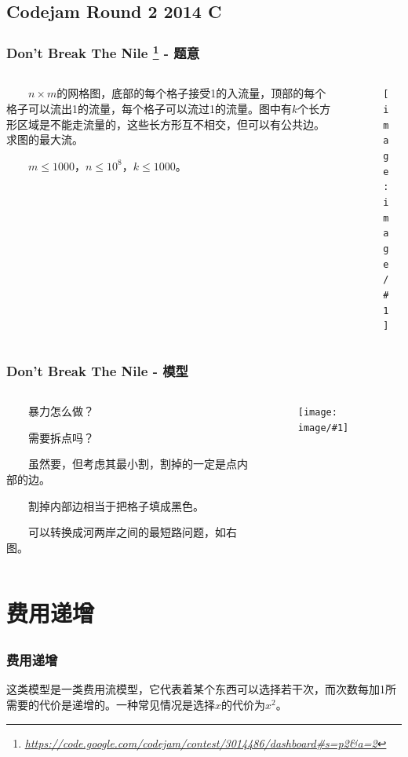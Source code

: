 \documentclass[9pt,dvipsnames,table]{beamer}
\newcommand{\hlink}[1]{
	\footnote{\fontsize{6pt}{\baselineskip}\href{#1}{\textsl{\underline{#1}}}}
}
\newcommand{\graph}[2]
{\begin{figure}[h]
	\centering
	\texttt{[image: image/\#1]}
\end{figure}}
\begin{document}
\subsection{Codejam Round 2 2014 C}
\begin{frame}
	\frametitle{Don't Break The Nile\hlink{https://code.google.com/codejam/contest/3014486/dashboard\#s=p2\&a=2} - 题意}
	\begin{columns}
		\begin{column}{0.475\textwidth}
			　　$n\times m$的网格图，底部的每个格子接受1的入流量，顶部的每个格子可以流出1的流量，每个格子可以流过1的流量。图中有$k$个长方形区域是不能走流量的，这些长方形互不相交，但可以有公共边。求图的最大流。
			
			　　$m\leq 1000$，$n\leq 10^8$，$k\leq 1000$。
		\end{column}
		\begin{column}{0.45\textwidth}
			\graph{codejam_1.png}{0.75}
		\end{column}
	\end{columns}
\end{frame}
\begin{frame}
	\frametitle{Don't Break The Nile - 模型}
	\begin{columns}
		\begin{column}{0.45\textwidth}
			　　暴力怎么做？\pause 
			
			　　需要拆点吗？\pause
			
			　　虽然要，但考虑其最小割，割掉的一定是点内部的边。\pause
			
			　　割掉内部边相当于把格子填成黑色。\pause
			
			　　可以转换成河两岸之间的最短路问题，如右图。
		\end{column}
		\begin{column}{0.45\textwidth}
			\graph{codejam_2.png}{0.8}
		\end{column}
	\end{columns}
\end{frame}

\section[Model V]{费用递增}
\subsection{}
\begin{frame}
	\frametitle{费用递增}
	这类模型是一类费用流模型，它代表着某个东西可以选择若干次，而次数每加1所需要的代价是递增的。一种常见情况是选择$x$的代价为$x^2$。
\end{frame}
\end{document}
